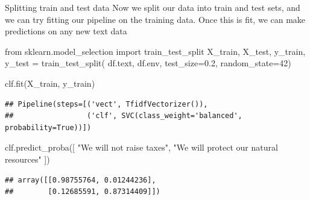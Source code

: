 \documentclass[
  10pt,
  ignorenonframetext,
  aspectratio=169]{beamer}
\newenvironment{Shaded}{\begin{snugshade}}{\end{snugshade}}
\newcommand{\DecValTok}[1]{\textcolor[rgb]{0.86,0.86,0.80}{#1}}
\newcommand{\FloatTok}[1]{\textcolor[rgb]{0.75,0.75,0.82}{#1}}
\newcommand{\ImportTok}[1]{\textcolor[rgb]{0.80,0.80,0.80}{#1}}
\newcommand{\NormalTok}[1]{\textcolor[rgb]{0.80,0.80,0.80}{#1}}
\newcommand{\OperatorTok}[1]{\textcolor[rgb]{0.94,0.94,0.82}{#1}}
\newcommand{\StringTok}[1]{\textcolor[rgb]{0.80,0.58,0.58}{#1}}
\begin{document}
\begin{frame}[fragile]{Splitting train and test data}
\protect\hypertarget{splitting-train-and-test-data}{}
Now we split our data into train and test sets, and we can try fitting
our pipeline on the training data. Once this is fit, we can make
predictions on any new text data

\medskip
\scriptsize

\begin{Shaded}
\begin{Highlighting}[]
\ImportTok{from}\NormalTok{ sklearn.model\_selection }\ImportTok{import}\NormalTok{ train\_test\_split}
\NormalTok{X\_train, X\_test, y\_train, y\_test }\OperatorTok{=}\NormalTok{ train\_test\_split(}
\NormalTok{    df.text, df.env, test\_size}\OperatorTok{=}\FloatTok{0.2}\NormalTok{, random\_state}\OperatorTok{=}\DecValTok{42}\NormalTok{)}

\NormalTok{clf.fit(X\_train, y\_train)}
\end{Highlighting}
\end{Shaded}

\begin{verbatim}
## Pipeline(steps=[('vect', TfidfVectorizer()),
##                 ('clf', SVC(class_weight='balanced', probability=True))])
\end{verbatim}

\begin{Shaded}
\begin{Highlighting}[]
\NormalTok{clf.predict\_proba([}
    \StringTok{"We will not raise taxes"}\NormalTok{,}
    \StringTok{"We will protect our natural resources"}
\NormalTok{])}
\end{Highlighting}
\end{Shaded}

\begin{verbatim}
## array([[0.98755764, 0.01244236],
##        [0.12685591, 0.87314409]])
\end{verbatim}
\end{frame}
\end{document}

